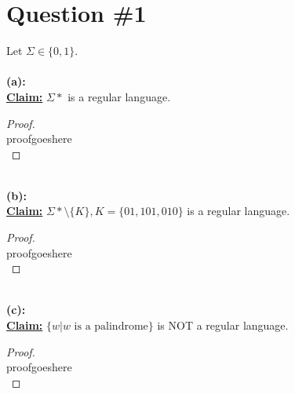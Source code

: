 \documentclass[12pt]{article}
\begin{document}
\renewcommand{\familydefault}{\rmdefault}



\pagebreak
\normalsize

\section*{Question \#1}
Let $\Sigma \in \{ 0, 1 \} $. \\
\\
\textbf{(a):} \\
\textbf{\underline{Claim:}} $\Sigma*$ is a regular language.
\begin{proof}
\leavevmode\\
    proofgoeshere \\
\end{proof}
\leavevmode\\
\textbf{(b):} \\
\textbf{\underline{Claim:}} $\Sigma* \setminus \{ K \}, K = \{ 01, 101, 010 \}$ is a regular language.
\begin{proof}
\leavevmode\\
    proofgoeshere \\
\end{proof}
\leavevmode\\
\textbf{(c):} \\
\textbf{\underline{Claim:}} $\{ w | w \text{ is a palindrome} \}$ is NOT a regular language.
\begin{proof}
\leavevmode\\
    proofgoeshere \\
\end{proof}
\end{document}
